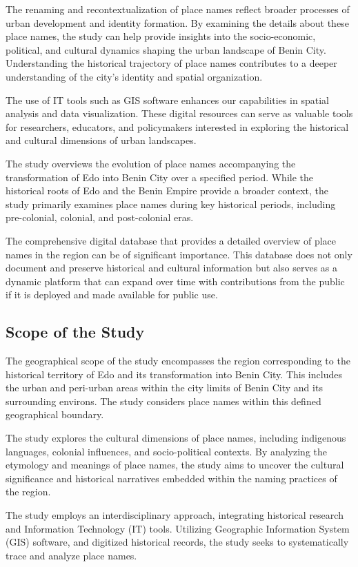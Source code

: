 The renaming and recontextualization of place names reflect broader processes of urban development and identity formation. By examining the details about these place names, the study can help provide insights into the socio-economic, political, and cultural dynamics shaping the urban landscape of Benin City. Understanding the historical trajectory of place names contributes to a deeper understanding of the city's identity and spatial organization.


The use of IT tools such as GIS software enhances our capabilities in spatial analysis and data visualization. These digital resources can serve as valuable tools for researchers, educators, and policymakers interested in exploring the historical and cultural dimensions of urban landscapes.


The study overviews the evolution of place names accompanying the transformation of Edo into Benin City over a specified period. While the historical roots of Edo and the Benin Empire provide a broader context, the study primarily examines place names during key historical periods, including pre-colonial, colonial, and post-colonial eras.


The comprehensive digital database that provides a detailed overview of place names in the region can be of significant importance. This database does not only document and preserve historical and cultural information but also serves as a dynamic platform that can expand over time with contributions from the public if it is deployed and made available for public use.


\subsection{Scope of the Study}
The geographical scope of the study encompasses the region corresponding to the historical territory of Edo and its transformation into Benin City. This includes the urban and peri-urban areas within the city limits of Benin City and its surrounding environs. The study considers place names within this defined geographical boundary.


The study explores the cultural dimensions of place names, including indigenous languages, colonial influences, and socio-political contexts. By analyzing the etymology and meanings of place names, the study aims to uncover the cultural significance and historical narratives embedded within the naming practices of the region.


The study employs an interdisciplinary approach, integrating historical research and Information Technology (IT) tools. Utilizing Geographic Information System (GIS) software, and digitized historical records, the study seeks to systematically trace and analyze place names.

